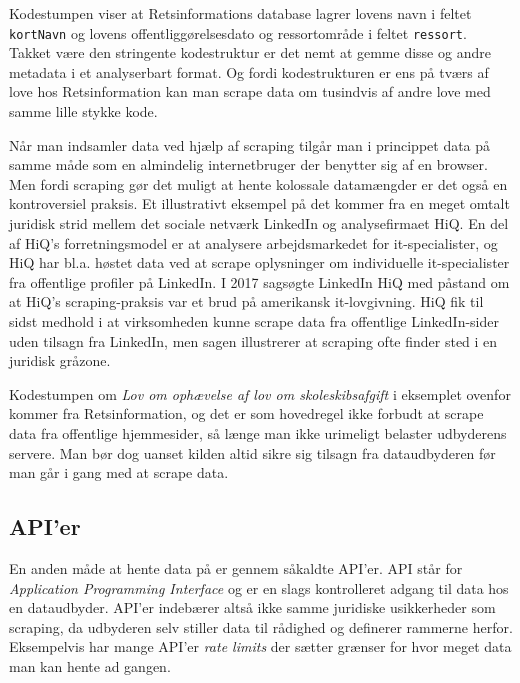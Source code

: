 \documentclass[12pt,]{article}
\begin{document}
Kodestumpen viser at Retsinformations database lagrer lovens navn i
feltet \texttt{kortNavn} og lovens offentliggørelsesdato og
ressortområde i feltet \texttt{ressort}. Takket være den stringente
kodestruktur er det nemt at gemme disse og andre metadata i et
analyserbart format. Og fordi kodestrukturen er ens på tværs af love hos
Retsinformation kan man scrape data om tusindvis af andre love med samme
lille stykke kode.

Når man indsamler data ved hjælp af scraping tilgår man i princippet
data på samme måde som en almindelig internetbruger der benytter sig af
en browser. Men fordi scraping gør det muligt at hente kolossale
datamængder er det også en kontroversiel praksis. Et illustrativt
eksempel på det kommer fra en meget omtalt juridisk strid mellem det
sociale netværk LinkedIn og analysefirmaet HiQ. En del af HiQ's
forretningsmodel er at analysere arbejdsmarkedet for it-specialister, og
HiQ har bl.a. høstet data ved at scrape oplysninger om individuelle
it-specialister fra offentlige profiler på LinkedIn. I 2017 sagsøgte
LinkedIn HiQ med påstand om at HiQ's scraping-praksis var et brud på
amerikansk it-lovgivning. HiQ fik til sidst medhold i at virksomheden
kunne scrape data fra offentlige LinkedIn-sider uden tilsagn fra
LinkedIn, men sagen illustrerer at scraping ofte finder sted i en
juridisk gråzone.

Kodestumpen om \emph{Lov om ophævelse af lov om skoleskibsafgift} i
eksemplet ovenfor kommer fra Retsinformation, og det er som hovedregel
ikke forbudt at scrape data fra offentlige hjemmesider, så længe man
ikke urimeligt belaster udbyderens servere. Man bør dog uanset kilden
altid sikre sig tilsagn fra dataudbyderen før man går i gang med at
scrape data.

\hypertarget{apier}{%
\subsection{API'er}\label{apier}}

En anden måde at hente data på er gennem såkaldte API'er. API står for
\emph{Application Programming Interface} og er en slags kontrolleret
adgang til data hos en dataudbyder. API'er indebærer altså ikke samme
juridiske usikkerheder som scraping, da udbyderen selv stiller data til
rådighed og definerer rammerne herfor. Eksempelvis har mange API'er
\emph{rate limits} der sætter grænser for hvor meget data man kan hente
ad gangen.
\end{document}
